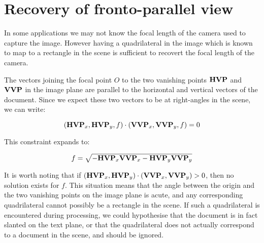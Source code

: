 \section{Recovery of fronto-parallel view}


In some applications we may not know the focal length of the camera used to capture the image.  However having a quadrilateral in the image which is known to map to a rectangle in the scene is sufficient to recovert the focal length of the camera.

The vectors joining the focal point $O$ to the two vanishing points ${ \bf HVP }$ and ${ \bf VVP }$ in the image plane are parallel to the horizontal and vertical vectors of the document.  Since we expect these two vectors to be at right-angles in the scene, we can write:

\begin{equation}
( { \bf HVP }_x , { \bf HVP }_y , f ) \cdot ( { \bf VVP }_x , { \bf VVP }_y , f ) = 0
\end{equation}

This constraint expands to:

\begin{equation}
f = \sqrt{ - { \bf HVP }_x { \bf VVP }_x - { \bf HVP }_y { \bf VVP }_y }
\end{equation}


It is worth noting that if $ ( { \bf HVP }_x , { \bf HVP }_y ) \cdot ( { \bf VVP }_x , { \bf VVP }_y ) > 0 $, then no solution exists for $f$.  This situation means that the angle between the origin and the two vanishing points on the image plane is acute, and any corresponding quadrilateral cannot possibly be a rectangle in the scene.  If such a quadrilateral is encountered during processing, we could hypothesise that the document is in fact slanted on the text plane, or that the quadrilateral does not actually correspond to a document in the scene, and should be ignored.

